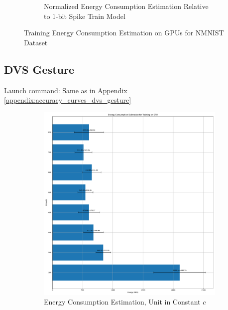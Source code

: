 \begin{figure}[H]
\begin{subfigure}[H]{0.48\textwidth}
                \caption{Normalized Energy Consumption Estimation Relative to 1-bit Spike Train Model}
            \end{subfigure}
            \caption{Training Energy Consumption Estimation on GPUs for NMNIST Dataset}
        \end{figure}

    \subsection{DVS Gesture}
    \label{appendix:energy_gpu_dvs_gesture}
        Launch command: Same as in Appendix \ref{appendix:accuracy_curves_dvs_gesture}

        \begin{figure}[H]
            \centering
            \begin{subfigure}[H]{0.48\textwidth}
                \includegraphics[width=\textwidth]{../standard/DVSGesture/plots/dvsgesture_train_energy_gpu.pdf}
                \caption{Energy Consumption Estimation, Unit in Constant $c$}
            \end{subfigure}
            \hfill
            \begin{subfigure}[H]{0.48\textwidth}

\end{subfigure}
\end{figure}
